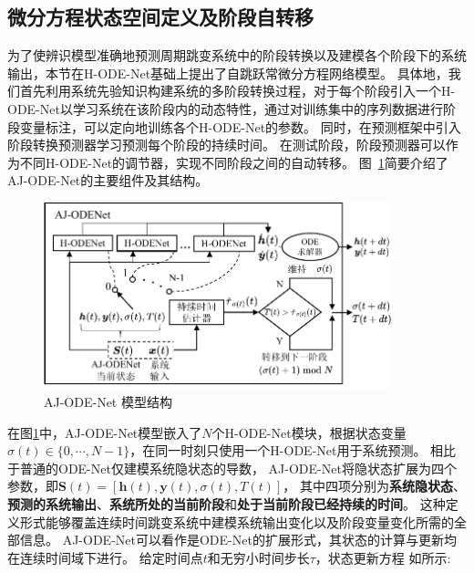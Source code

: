 \subsection{微分方程状态空间定义及阶段自转移}
为了使辨识模型准确地预测周期跳变系统中的阶段转换以及建模各个阶段下的系统输出，本节在H-ODE-Net基础上提出了自跳跃常微分方程网络模型。
具体地，我们首先利用系统先验知识构建系统的多阶段转换过程，对于每个阶段引入一个H-ODE-Net以学习系统在该阶段内的动态特性，通过对训练集中的序列数据进行阶段变量标注，可以定向地训练各个H-ODE-Net的参数。
同时，在预测框架中引入阶段转换预测器学习预测每个阶段的持续时间。
在测试阶段，阶段预测器可以作为不同H-ODE-Net的调节器，实现不同阶段之间的自动转移。
图~\ref{fig:AJ_ODEs}简要介绍了AJ-ODE-Net的主要组件及其结构。
\begin{figure}
    \centering
    \includegraphics[width=0.9\textwidth]{figures/chapter4/Jump-ODEnet.pdf}
    \caption{AJ-ODE-Net 模型结构}
    \label{fig:AJ_ODEs}
\end{figure}

在图\ref{fig:AJ_ODEs}中，AJ-ODE-Net模型嵌入了$N$个H-ODE-Net模块，根据状态变量$\sigma(t)\in \{0,\cdots,N-1\}$，在同一时刻只使用一个H-ODE-Net用于系统预测。
相比于普通的ODE-Net仅建模系统隐状态的导数，
AJ-ODE-Net将隐状态扩展为四个参数，即$\boldsymbol{S}(t) = [\boldsymbol h(t), \boldsymbol y(t), \sigma(t), T(t)]$，
其中四项分别为\textbf{系统隐状态}、\textbf{预测的系统输出}、\textbf{系统所处的当前阶段}和\textbf{处于当前阶段已经持续的时间}。
这种定义形式能够覆盖连续时间跳变系统中建模系统输出变化以及阶段变量变化所需的全部信息。
AJ-ODE-Net可以看作是ODE-Net的扩展形式，其状态的计算与更新均在连续时间域下进行。
给定时间点$t$和无穷小时间步长$\tau$，状态更新方程
如所示:

